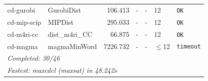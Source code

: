 \begin{longtable}{llrrrl p{}}
cd-gurobi & GurobiDist & 106.413 & - & - & 12 & \texttt{OK} \\
cd-mip-scip & MIPDist & 295.033 & - & - & 12 & \texttt{OK} \\
cd-m4ri-cc & dist\_m4ri\_CC & 66.875 & - & - & 12 & \texttt{OK} \\
cd-magma & magmaMinWord & 7226.732 & - & - & $\leq$12 & \texttt{timeout} \\
\midrule
\multicolumn{7}{l}{\textit{Completed: 30/46}} \\
\multicolumn{7}{l}{\textit{Fastest: maxcdcl (maxsat) in 48.242s}} \\
\end{longtable}
